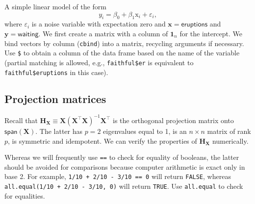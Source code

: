 \documentclass[]{book}
\newenvironment{Shaded}{\begin{snugshade}}{\end{snugshade}}
\newcommand{\KeywordTok}[1]{\textcolor[rgb]{0.13,0.29,0.53}{\textbf{#1}}}
\newcommand{\DecValTok}[1]{\textcolor[rgb]{0.00,0.00,0.81}{#1}}
\newcommand{\StringTok}[1]{\textcolor[rgb]{0.31,0.60,0.02}{#1}}
\newcommand{\CommentTok}[1]{\textcolor[rgb]{0.56,0.35,0.01}{\textit{#1}}}
\newcommand{\OperatorTok}[1]{\textcolor[rgb]{0.81,0.36,0.00}{\textbf{#1}}}
\newcommand{\NormalTok}[1]{#1}
\theoremstyle{definition}
\theoremstyle{definition}
\theoremstyle{definition}
\theoremstyle{remark}
\let\BeginKnitrBlock\begin \let\EndKnitrBlock\end
\begin{document}
A simple linear model of the form
\[y_i = \beta_0 + \beta_1 \mathrm{x}_i + \varepsilon_i,\] where
\(\varepsilon_i\) is a noise variable with expectation zero and
\(\mathbf{x} = \mathsf{eruptions}\) and
\(\boldsymbol{y} = \mathsf{waiting}\). We first create a matrix with a
column of \(\mathbf{1}_n\) for the intercept. We bind vectors by column
(\texttt{cbind}) into a matrix, recycling arguments if necessary. Use
\texttt{\$} to obtain a column of the data frame based on the name of
the variable (partial matching is allowed, e.g., \texttt{faithful\$er}
is equivalent to \texttt{faithful\$eruptions} in this case).

\begin{Shaded}
\end{Shaded}

\subsection{Projection matrices}\label{projection-matrices}

Recall that
\(\mathbf{H}_{\mathbf{X}} \equiv \mathbf{X}(\mathbf{X}^\top\mathbf{X})^{-1}\mathbf{X}^\top\)
is the orthogonal projection matrix onto \(\mathsf{span}(\mathbf{X})\).
The latter has \(p=2\) eigenvalues equal to 1, is an \(n \times n\)
matrix of rank \(p\), is symmetric and idempotent. We can verify the
properties of \(\mathbf{H}_{\mathbf{X}}\) numerically.

\BeginKnitrBlock{rmdcaution}
Whereas we will frequently use \texttt{==} to check for equality of
booleans, the latter should be avoided for comparisons because computer
arithmetic is exact only in base 2. For example,
\texttt{1/10\ +\ 2/10\ -\ 3/10\ ==\ 0} will return \texttt{FALSE},
whereas \texttt{all.equal(1/10\ +\ 2/10\ -\ 3/10,\ 0)} will return
\texttt{TRUE}. Use \texttt{all.equal} to check for equalities.
\EndKnitrBlock{rmdcaution}

\begin{Shaded}
\end{Shaded}
\end{document}
